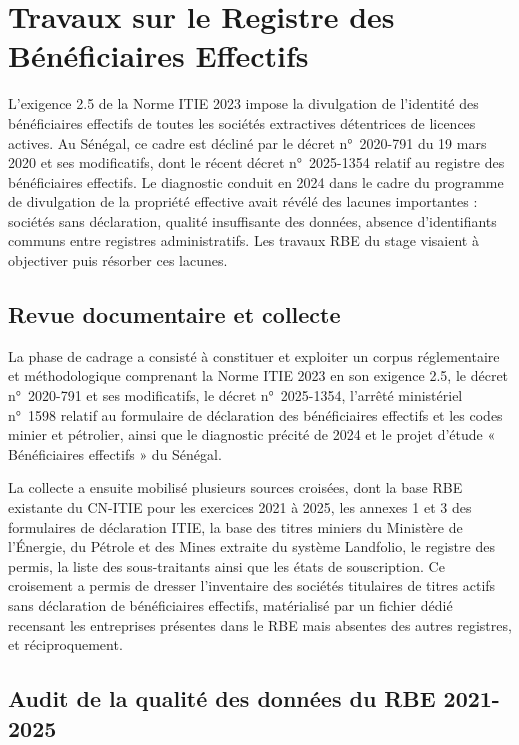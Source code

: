 \documentclass[12pt, a4paper]{article}
\begin{document}
\section{Travaux sur le Registre des Bénéficiaires Effectifs}

L'exigence 2.5 de la Norme ITIE 2023 impose la divulgation de l'identité des
bénéficiaires effectifs de toutes les sociétés extractives détentrices de
licences actives. Au Sénégal, ce cadre est décliné par le décret n°~2020-791 du
19 mars 2020 et ses modificatifs, dont le récent décret n°~2025-1354 relatif au
registre des bénéficiaires effectifs. Le diagnostic conduit en 2024 dans le cadre du programme de divulgation de la
propriété effective avait révélé des lacunes importantes :
sociétés sans déclaration, qualité insuffisante des données, absence
d'identifiants communs entre registres administratifs. Les travaux RBE du stage
visaient à objectiver puis résorber ces lacunes.

\subsection{Revue documentaire et collecte}

La phase de cadrage a consisté à constituer et exploiter un corpus
réglementaire et méthodologique comprenant la Norme ITIE 2023 en son exigence 2.5, le décret
n°~2020-791 et ses modificatifs, le décret n°~2025-1354, l'arrêté ministériel
n°~1598 relatif au formulaire de déclaration des bénéficiaires effectifs et les
codes minier et pétrolier, ainsi que le diagnostic précité de 2024 et le projet d'étude
« Bénéficiaires effectifs » du Sénégal.

La collecte a ensuite mobilisé plusieurs sources croisées, dont la base RBE
existante du CN-ITIE pour les exercices 2021 à 2025, les annexes 1 et 3 des
formulaires de déclaration ITIE, la base des titres miniers du Ministère de
l'Énergie, du Pétrole et des Mines extraite du système Landfolio, le registre
des permis, la liste des sous-traitants ainsi que les
états de souscription. Ce croisement a permis de dresser l'inventaire des
sociétés titulaires de titres actifs sans déclaration de bénéficiaires
effectifs, matérialisé par un fichier dédié recensant les entreprises présentes
dans le RBE mais absentes des autres registres, et réciproquement.

\subsection{Audit de la qualité des données du RBE 2021-2025}
\end{document}
